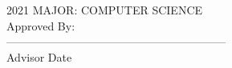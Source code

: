 \begin{flushleft}
    \vspace*{-0.20in}
    \hspace*{3.09in}2021 %
    \hspace*{3.09in}MAJOR: COMPUTER SCIENCE\\ %
    \hspace*{3.09in}Approved By:\\
    \hspace*{3.09in}-----------------------------------------------------------\\
    \vspace*{-0.25in}
    \hspace*{3.09in}Advisor\hspace*{1.5in} Date\hspace*{0.1in}\\
\end{flushleft}
